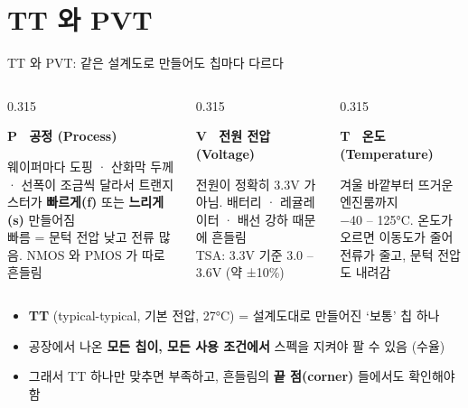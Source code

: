 \documentclass[aspectratio=169,11pt,xcolor=table]{beamer}
\newcommand{\boxtitle}[1]{{\bfseries\color{brand}#1}\par\smallskip}
\begin{document}
\section{TT 와 PVT}

\begin{frame}{TT 와 PVT: 같은 설계도로 만들어도 칩마다 다르다}
  \begin{columns}[T,onlytextwidth]
    \begin{column}{0.315\textwidth}
      \begin{keybox}[equal height group=pvt]
        \boxtitle{P \ {\normalfont\small 공정 (Process)}}
        \small 웨이퍼마다 도핑 · 산화막 두께 · 선폭이 조금씩 달라서 트랜지스터가
        \textbf{빠르게(f)} 또는 \textbf{느리게(s)} 만들어짐\\[3pt]
        {\footnotesize 빠름 = 문턱 전압 낮고 전류 많음. NMOS 와 PMOS 가 따로 흔들림}
      \end{keybox}
    \end{column}
    \begin{column}{0.315\textwidth}
      \begin{keybox}[equal height group=pvt]
        \boxtitle{V \ {\normalfont\small 전원 전압 (Voltage)}}
        \small 전원이 정확히 3.3V 가 아님. 배터리 · 레귤레이터 · 배선 강하 때문에 흔들림\\[3pt]
        {\footnotesize TSA: 3.3V 기준 3.0 – 3.6V (약 ±10\%)}
      \end{keybox}
    \end{column}
    \begin{column}{0.315\textwidth}
      \begin{keybox}[equal height group=pvt]
        \boxtitle{T \ {\normalfont\small 온도 (Temperature)}}
        \small 겨울 바깥부터 뜨거운 엔진룸까지\\[3pt]
        {\footnotesize −40 – 125°C. 온도가 오르면 이동도가 줄어 전류가 줄고, 문턱 전압도 내려감}
      \end{keybox}
    \end{column}
  \end{columns}
  \vspace{0.5em}
  \begin{itemize}\small
    \item \textbf{TT} (typical-typical, 기본 전압, 27°C) = 설계도대로 만들어진 ‘보통’ 칩 하나
    \item 공장에서 나온 \textbf{모든 칩이, 모든 사용 조건에서} 스펙을 지켜야 팔 수 있음 (수율)
    \item 그래서 TT 하나만 맞추면 부족하고, 흔들림의 \textbf{끝 점(corner)} 들에서도 확인해야 함
  \end{itemize}
\end{frame}
\end{document}
